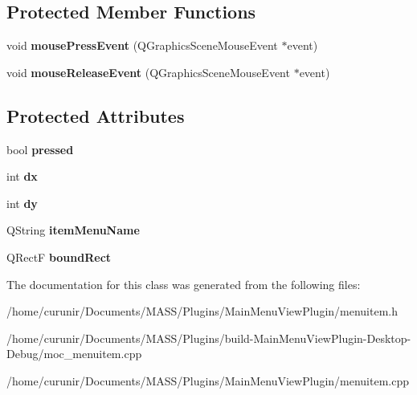\subsection*{Protected Member Functions}
\begin{DoxyCompactItemize}
\item 
void {\bfseries mouse\+Press\+Event} (Q\+Graphics\+Scene\+Mouse\+Event $\ast$event)\hypertarget{class_menu_item_graphics_object_a6f291090f45fc75a171ae55a09fd4f3d}{}\label{class_menu_item_graphics_object_a6f291090f45fc75a171ae55a09fd4f3d}

\item 
void {\bfseries mouse\+Release\+Event} (Q\+Graphics\+Scene\+Mouse\+Event $\ast$event)\hypertarget{class_menu_item_graphics_object_addbf1e6b7247679ccf8b31f6a885f6e6}{}\label{class_menu_item_graphics_object_addbf1e6b7247679ccf8b31f6a885f6e6}

\end{DoxyCompactItemize}
\subsection*{Protected Attributes}
\begin{DoxyCompactItemize}
\item 
bool {\bfseries pressed}\hypertarget{class_menu_item_graphics_object_ac8a4aab9ad0917b4f4270225a7ecbb58}{}\label{class_menu_item_graphics_object_ac8a4aab9ad0917b4f4270225a7ecbb58}

\item 
int {\bfseries dx}\hypertarget{class_menu_item_graphics_object_aba38dc2a531e530d08f2aa92544f3104}{}\label{class_menu_item_graphics_object_aba38dc2a531e530d08f2aa92544f3104}

\item 
int {\bfseries dy}\hypertarget{class_menu_item_graphics_object_a9b7f14de2c2e5ff71aad8a6ab729ef1d}{}\label{class_menu_item_graphics_object_a9b7f14de2c2e5ff71aad8a6ab729ef1d}

\item 
Q\+String {\bfseries item\+Menu\+Name}\hypertarget{class_menu_item_graphics_object_a6ed305de3a3718503a5e3dabdbc07786}{}\label{class_menu_item_graphics_object_a6ed305de3a3718503a5e3dabdbc07786}

\item 
Q\+RectF {\bfseries bound\+Rect}\hypertarget{class_menu_item_graphics_object_ae78d7732b7108406484238c3814bb1e6}{}\label{class_menu_item_graphics_object_ae78d7732b7108406484238c3814bb1e6}

\end{DoxyCompactItemize}


The documentation for this class was generated from the following files\+:\begin{DoxyCompactItemize}
\item 
/home/curunir/\+Documents/\+M\+A\+S\+S/\+Plugins/\+Main\+Menu\+View\+Plugin/menuitem.\+h\item 
/home/curunir/\+Documents/\+M\+A\+S\+S/\+Plugins/build-\/\+Main\+Menu\+View\+Plugin-\/\+Desktop-\/\+Debug/moc\+\_\+menuitem.\+cpp\item 
/home/curunir/\+Documents/\+M\+A\+S\+S/\+Plugins/\+Main\+Menu\+View\+Plugin/menuitem.\+cpp\end{DoxyCompactItemize}
